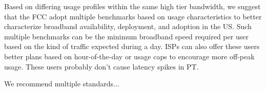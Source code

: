 Based on differing usage profiles within the same high tier bandwidth, we suggest that the FCC adopt multiple benchmarks based on usage characteristics to better characterize broadband availability, deployment, and adoption in the US. Such multiple benchmarks can be the minimum broadband speed required per user based on the kind of traffic expected during a day. ISPs can also offer these users better plans based on hour-of-the-day or usage caps to encourage more off-peak usage. These users probably don't cause latency spikes in PT.


We recommend multiple standards...